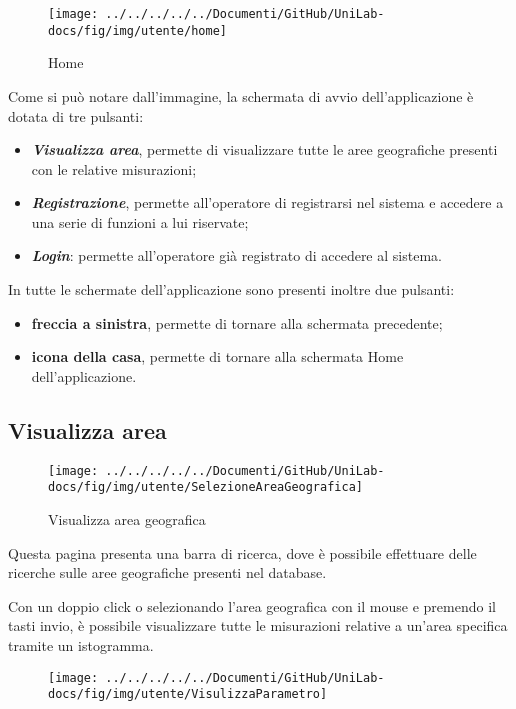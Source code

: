 \begin{figure}[h]
	\centering
	\texttt{[image: ../../../../../Documenti/GitHub/UniLab-docs/fig/img/utente/home]}
	\caption{Home}
	\label{fig:home}
\end{figure}

Come si può notare dall'immagine, la schermata di avvio dell'applicazione è dotata di tre pulsanti:
\begin{itemize}
	\item \textbf{\textit{Visualizza area}}, permette di visualizzare tutte le aree geografiche presenti con le relative misurazioni;
	\item \textbf{\textit{Registrazione}}, permette all'operatore di registrarsi nel sistema e accedere a una serie di funzioni a lui riservate;
	\item \textbf{\textit{Login}}: permette all'operatore già registrato di accedere al sistema. 
\end{itemize}
In tutte le schermate dell'applicazione sono presenti inoltre due pulsanti:
\begin{itemize}
	\item \textbf{freccia a sinistra}, permette di tornare alla schermata precedente;
	\item \textbf{icona della casa}, permette di tornare alla schermata Home dell'applicazione.
\end{itemize}

\subsection{Visualizza area}\label{VisualizzaArea}

\begin{figure}[h]
	\centering
	\texttt{[image: ../../../../../Documenti/GitHub/UniLab-docs/fig/img/utente/SelezioneAreaGeografica]}
	\caption{Visualizza area geografica}
	\label{fig:selezioneareageografica}
\end{figure}

Questa pagina presenta una barra di ricerca, dove è possibile effettuare delle ricerche sulle aree geografiche presenti nel database.

\pagebreak

Con un doppio click o selezionando l'area geografica con il mouse e premendo il tasti invio, è possibile visualizzare tutte le misurazioni relative a un'area specifica tramite un istogramma.

\begin{figure}[h]
	\centering
	\texttt{[image: ../../../../../Documenti/GitHub/UniLab-docs/fig/img/utente/VisulizzaParametro]}
	\caption{}
	\label{fig:visulizzaparametro}
\end{figure}

